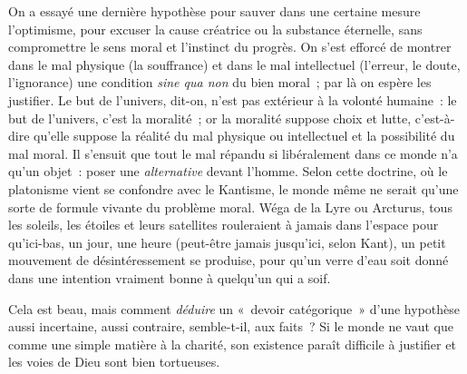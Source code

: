 \documentclass[french,twoside]{book} %
\begin{document}
On a essayé une dernière hypothèse pour sauver dans une certaine mesure l’optimisme, pour excuser la cause créatrice ou la substance éternelle, sans compromettre le sens moral et l’instinct du progrès. On s’est efforcé de montrer dans le mal physique (la souffrance) et dans le mal intellectuel (l’erreur, le doute, l’ignorance) une condition \emph{sine qua non} du bien moral ; par là on espère les justifier. Le but de l’univers, dit-on, n’est pas extérieur à la volonté humaine : le but de l’univers, c’est la moralité ; or la moralité suppose choix et lutte, c’est-à-dire qu’elle suppose la réalité du mal physique ou intellectuel et la possibilité du mal moral. Il s’ensuit que tout le mal répandu si libéralement dans ce monde n’a qu’un objet : poser une \emph{alternative} devant l’homme. Selon cette doctrine, où le platonisme vient se confondre avec le Kantisme, le monde même ne serait qu’une sorte de formule vivante du problème moral. Wéga de la Lyre ou Arcturus, tous les soleils, les étoiles et leurs satellites rouleraient à jamais dans l’espace pour qu’ici-bas, un jour, une heure (peut-être jamais jusqu’ici, selon Kant), un petit mouvement de désintéressement se produise, pour qu’un verre d’eau soit donné dans une intention vraiment bonne à quelqu’un qui a soif.\par
Cela est beau, mais comment \emph{déduire} un « devoir catégorique » d’une hypothèse aussi incertaine, aussi contraire, semble-t-il, aux faits ? Si le monde ne vaut que comme une simple matière à la charité, son existence paraît difficile à justifier et les voies de Dieu sont bien tortueuses.\par
\end{document}

